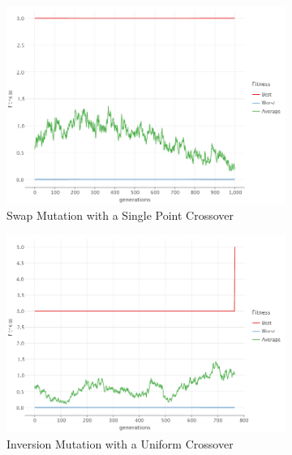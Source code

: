 \begin{figure}[ht!]
\begin{subfigure}{0.45\textwidth}
            \includegraphics[width=\textwidth]{img/beacon_sp_swap_2.png}
            \caption{Swap Mutation with a Single Point Crossover}
            \label{fig:beacon:2:swap}
        \end{subfigure}
        \hfill
        \begin{subfigure}{0.45\textwidth}
            \includegraphics[width=\textwidth]{img/beacon_uniform_inv_2.png}
            \caption{Inversion Mutation with a Uniform Crossover}
            \label{fig:beacon:4:inversion}
        \end{subfigure}
        \begin{subfigure}{0.45\textwidth}

\end{subfigure}
\end{figure}

